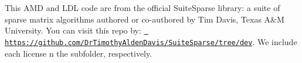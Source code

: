 This AMD and LDL code are from the official Suite\+Sparse library\+: a suite of sparse matrix algorithms authored or co-\/authored by Tim Davis, Texas A\&M University. You can visit this repo by\+: \href{https://github.com/DrTimothyAldenDavis/SuiteSparse/tree/dev}{\texttt{ https\+://github.\+com/\+Dr\+Timothy\+Alden\+Davis/\+Suite\+Sparse/tree/dev}}. We include each license n the subfolder, respectively. 